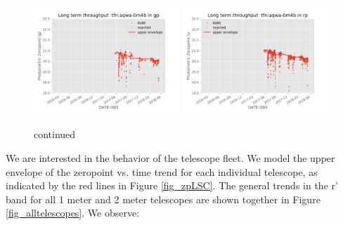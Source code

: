 \documentclass[]{spie}
\begin{document}
\begin{figure}
\includegraphics[width=0.49\textwidth]{images/photzptrend-tfn-aqwa-0m4b-gp.png} \hspace*{\fill}
\includegraphics[width=0.49\textwidth]{images/photzptrend-tfn-aqwa-0m4b-rp.png} \\[1ex]
\caption {continued}
\end{figure}


We are interested in the behavior of the telescope fleet. We model the upper
envelope of the zeropoint vs. time trend for each individual telescope, as indicated by the red
lines in Figure \ref{fig_zpLSC}. The general trends in the r' band for all 1 meter and 2 meter telescopes
are shown together in Figure \ref{fig_alltelescopes}. We observe:
\end{document}
